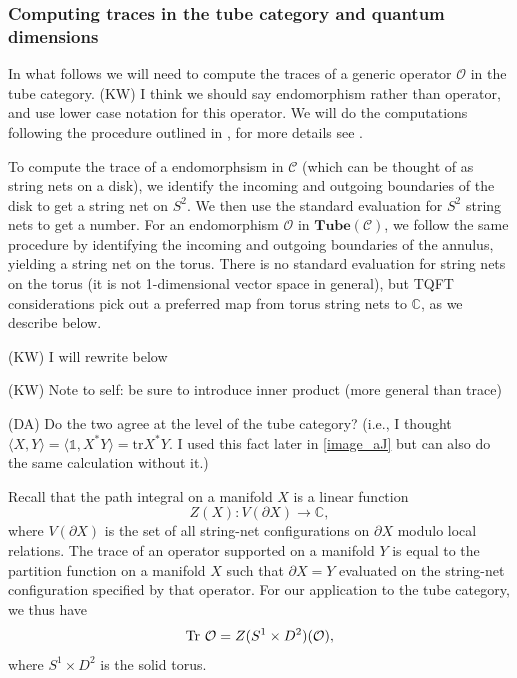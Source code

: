 \documentclass[12pt,a4paper]{article}
\newcounter{arrow}
\newcommand{\ra}{\rightarrow}
\newcommand{\unit}{\mathds{1}}
\newcommand{\cc}{\mathbb{C}}
\newcommand{\mcc}{\mathcal{C}}
\newcommand{\mco}{\mathcal{O}}
\newcommand\be            {\begin{equation}}
\newcommand\ee            {\end{equation}}
\newcommand{\p}{\partial}
\newcommand{\tube}{\textbf{Tube}}
\newcommand{\kw}[1]{{\color{kwcolor}\footnotesize{(KW) #1}}}
\newcommand{\dave}[1]{{\color{ao(english)}\footnotesize{(DA) #1}}}
\begin{document}
\subsubsection{Computing traces in the tube category and quantum dimensions} \label{qdims_and_traces}


In what follows we will need to compute the traces of a generic operator $\mco$ in the tube category. 
\kw{I think we should say endomorphism rather than operator, and use lower case notation for this operator.}
We will do the computations following the procedure outlined in \cite{Walker2006}, for more details see \cite{ghosh2016,das2014}.

To compute the trace of a endomorphsism in $\mcc$ (which can be thought of
as string nets on a disk), we identify the incoming and outgoing
boundaries of the disk to get a string net on $S^2$.
We then use the standard evaluation for $S^2$ string nets to get a number.
For an endomorphism $\mco$ in $\tube(\mcc)$, we follow the same procedure by identifying the incoming and outgoing
boundaries of the annulus, yielding a string net on the torus.
There is no standard evaluation for string nets on the torus (it is not 1-dimensional vector space in general),
but TQFT considerations pick out a preferred map from torus string nets to $\cc$, as we describe below.


\kw{I will rewrite below}

\kw{Note to self: be sure to introduce inner product (more general than trace)}

\dave{Do the two agree at the level of the tube category?
(i.e., I thought $\langle X, Y \rangle  = \langle \unit ,X^*Y\rangle = \text{tr} X^*Y$.
I used this fact later in \ref{image_aJ} but can also do the same calculation without it.)}

Recall that the path integral on a manifold $X$ is a linear function
\be Z(X) : V(\p X) \ra \cc,\ee
where $V(\p X)$ is the set of all string-net configurations on $\p X$ modulo local relations.
The trace of an operator supported on a manifold $Y$ is equal to the partition function on a manifold $X$ 
such that $\p X = Y$ evaluated on the string-net configuration specified by that operator. 
For our application to the tube category, we thus have 
\be {\rm Tr}\ \mco = Z(S^1 \times D^2)(\mco),\ee
where $S^1\times D^2$ is the solid torus. 
\end{document}
